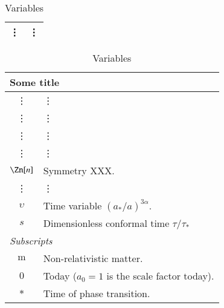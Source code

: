 \begin{table}[t]
\begin{minipage}[t]{0.5\linewidth}
{{\begin{tabular*}{\linewidth}{c l}
            \vdots & \vdots\\
            \bottomrule
        \end{tabular*}
        }}
    \end{minipage}\hfill
    \begin{minipage}[t]{0.5\linewidth}
        {\small{
        \begin{tabular*}{\linewidth}{c l}
            \multicolumn{2}{l}{\textsf{Some title}} \\
            \toprule
            \vdots & \vdots \\
            \vdots & \vdots \\
            \vdots & \vdots \\
            \vdots & \vdots \\
            $\Zn[n]$ & Symmetry XXX. \\
            \vdots & \vdots \\
            $\upsilon$ &  Time variable $(a_\ast/a)^{3\alpha}$. \\
            $s$ &  Dimensionless conformal time $\tau/\tau_\ast$  \\
            \midrule
            \multicolumn{2}{l}{\textit{Subscripts}} \\
            \midrule
            $\mathrm{m}$ & Non-relativistic matter. \\
            $0$ & Today ($a_0=1$ is the scale factor today). \\
            $*$ & Time of phase transition. \\
            \bottomrule
        \end{tabular*}
        }}
    \end{minipage}
    \caption{Variables \blahblah}
\end{table}










